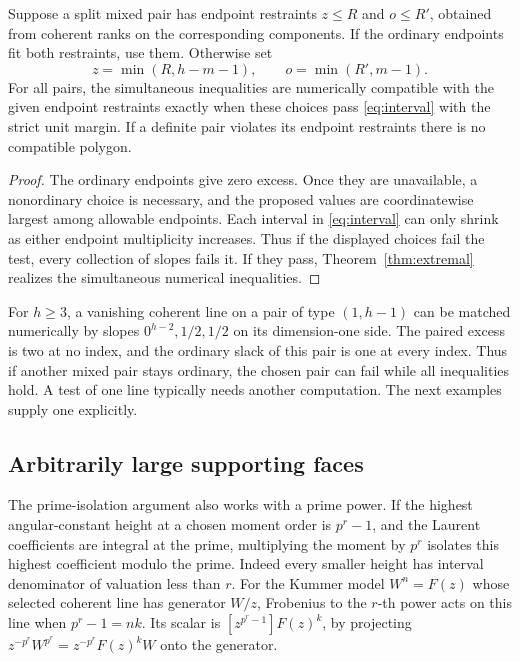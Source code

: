 \begin{proposition}\label{prop:rankcaps}
Suppose a split mixed pair has endpoint restraints \(z\le R\)
and \(o\le R'\), obtained from coherent ranks on the corresponding
components. If the ordinary endpoints fit both restraints, use
them. Otherwise set
\[
       z=\min(R,h-m-1),\qquad o=\min(R',m-1).
\]
For all pairs, the simultaneous inequalities are numerically
compatible with the given endpoint restraints exactly when
these choices pass \eqref{eq:interval} with the strict unit
margin. If a definite pair violates its endpoint restraints
there is no compatible polygon.
\end{proposition}

\begin{proof}
The ordinary endpoints give zero excess. Once they are
unavailable, a nonordinary choice is necessary, and the proposed
values are coordinatewise largest among allowable endpoints.
Each interval in \eqref{eq:interval} can only shrink as either
endpoint multiplicity increases. Thus if the displayed choices
fail the test, every collection of slopes fails it. If they pass,
Theorem~\ref{thm:extremal} realizes the simultaneous numerical
inequalities.
\end{proof}

For \(h\ge3\), a vanishing coherent line on a pair of type
\((1,h-1)\) can be matched numerically by slopes
\(0^{h-2},1/2,1/2\) on its dimension-one side. The paired excess
is two at no index, and the ordinary slack of this pair is one at
every index. Thus if another mixed pair stays ordinary, the
chosen pair can fail while all inequalities hold. A test of one
line typically needs another computation. The next examples
supply one explicitly.

\subsection{Arbitrarily large supporting faces}

The prime-isolation argument also works with a prime power.
If the highest angular-constant height at a chosen moment order
is \(p^r-1\), and the Laurent coefficients are integral at the
prime, multiplying the moment by \(p^r\) isolates this highest
coefficient modulo the prime. Indeed every smaller height has
interval denominator of valuation less than \(r\).
For the Kummer model \(W^n=F(z)\) whose selected coherent line
has generator \(W/z\), Frobenius to the \(r\)-th power
acts on this line when \(p^r-1=nk\). Its scalar is
\([z^{p^r-1}]F(z)^k\), by projecting
\(z^{-p^r}W^{p^r}=z^{-p^r}F(z)^k W\) onto the generator.

